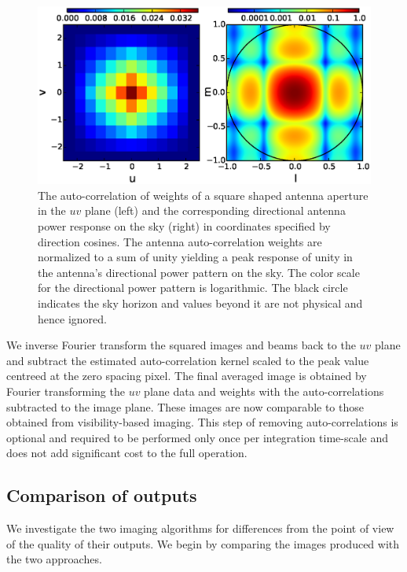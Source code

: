 \documentclass[a4paper,fleqn,usenatbib]{mnras}
\begin{document}
\begin{figure}
  \includegraphics[width=\columnwidth]{figure5}
  \caption{The auto-correlation of weights of a square shaped antenna aperture
    in the $uv$ plane (left) and the corresponding directional antenna power 
    response on the sky (right) in coordinates specified by direction cosines. 
    The antenna auto-correlation weights are normalized to a sum
    of unity yielding a peak response of unity in the antenna's directional
    power pattern on the sky. The color scale for the directional power 
    pattern is logarithmic. The black circle indicates the sky horizon and
    values beyond it are not physical and hence ignored.}
  \label{fig:autocorr_wts_PB}
\end{figure}

We inverse Fourier transform the squared images and beams back to the $uv$ 
plane and subtract the estimated auto-correlation kernel scaled to the peak 
value centreed at the zero spacing pixel. The final averaged image is obtained 
by Fourier transforming the $uv$ plane data and weights with the 
auto-correlations subtracted to the image plane. These images are now comparable 
to those obtained from visibility-based imaging. This step of removing 
auto-correlations is optional and required to be performed only once per 
integration time-scale and does not add significant cost to the full operation.

\subsection{Comparison of outputs}\label{sec:diff}

We investigate the two imaging algorithms for differences from the point of 
view of the quality of their outputs. We begin by comparing the images produced 
with the two approaches. 
\end{document}
